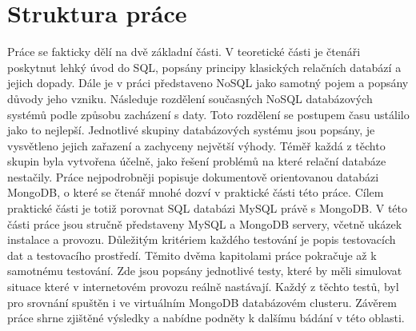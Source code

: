 \section{Struktura práce}
Práce se fakticky dělí na dvě základní části. V teoretické části je čtenáři poskytnut lehký úvod do SQL, popsány principy klasických relačních databází a jejich dopady. Dále je v práci představeno NoSQL jako samotný pojem a popsány důvody jeho vzniku. Následuje rozdělení současných NoSQL databázových systémů podle způsobu zacházení s daty. Toto rozdělení se postupem času ustálilo jako to nejlepší. Jednotlivé skupiny databázových systému jsou popsány, je vysvětleno jejich zařazení a zachyceny největší výhody. Téměř každá z těchto skupin byla vytvořena účelně, jako řešení problémů na které relační databáze nestačily. Práce nejpodrobněji popisuje dokumentově orientovanou databázi MongoDB, o které se čtenář mnohé dozví v praktické části této práce. Cílem praktické části je totiž porovnat SQL databázi MySQL právě s MongoDB. V této části práce jsou stručně představeny MySQL a MongoDB servery, včetně ukázek instalace a provozu. Důležitým kritériem každého testování je popis testovacích dat a testovacího prostředí. Těmito dvěma kapitolami práce pokračuje až k samotnému testování. Zde jsou popsány jednotlivé testy, které by měli simulovat situace které v internetovém provozu reálně nastávají. Každý z těchto testů, byl pro srovnání spuštěn i ve virtuálním MongoDB databázovém clusteru. Závěrem práce shrne zjištěné výsledky a nabídne podněty k dalšímu bádání v této oblasti.

